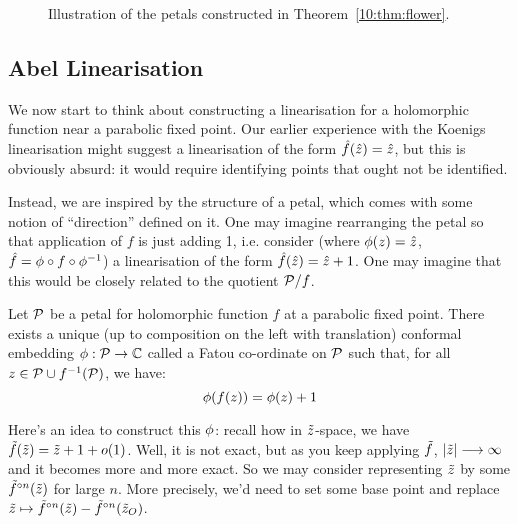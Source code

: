 \documentclass[../main.tex]{subfiles}
\begin{document}
\begin{figure}
    \label{10:fig:petals}
    \centering
    
    \caption{Illustration of the petals constructed in Theorem~\ref{10:thm:flower}.}
\end{figure}

\subsection{Abel Linearisation}

We now start to think about constructing a linearisation for a holomorphic function near a parabolic fixed point. Our earlier experience with the Koenigs linearisation might suggest a linearisation of the form $\hat{f}(\hat{z})=\hat{z}$, but this is obviously absurd: it would require identifying points that ought not be identified. %

Instead, we are inspired by the structure of a petal, which comes with some notion of ``direction'' defined on it. One may imagine rearranging the petal so that application of $f$ is just adding 1, i.e. consider (where $\phi(z)=\hat{z}$, $\hat{f}=\phi\circ f\circ \phi^{-1}$) a linearisation of the form $\hat{f}(\hat{z})=\hat{z}+1$. One may imagine that this would be closely related to the quotient $\mathcal{P}/f$. 

\begin{thm}
    \label{10:thm:linear}
    Let $\mathcal{P}$ be a petal for holomorphic function $f$ at a parabolic fixed point. There exists a unique (up to composition on the left with translation) conformal embedding $\phi:\mathcal{P}\to\mathbb{C}$ called a Fatou co-ordinate on $\mathcal{P}$ such that, for all $z\in\mathcal{P}\cup {f}^{-1}(\mathcal{P})$, we have:
    \begin{equation*}
        \phi(f(z))=\phi(z)+1
    \end{equation*}
\end{thm}

Here's an idea to construct this $\phi$: recall how in $\tilde{z}$-space, we have $\tilde{f}(\tilde{z}) = \tilde{z} + 1 + o(1)$. Well, it is not exact, but as you keep applying $\tilde{f}$, $\left|\tilde{z}\right|\longrightarrow\infty$ and it becomes more and more exact. So we may consider representing $\tilde{z}$ by some $\tilde{f}^{\circ n}(\tilde{z})$ for large $n$. More precisely, we'd need to set some base point and replace $\tilde{z}\mapsto \tilde{f}^{\circ n}(\tilde{z})-\tilde{f}^{\circ n}(\tilde{z}_O)$.
\end{document}
